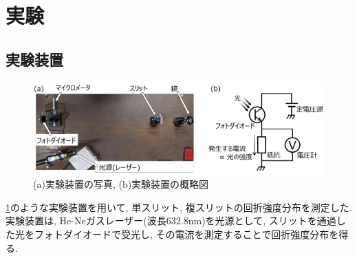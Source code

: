 \documentclass[11pt]{ltjsarticle}
\begin{document}
  \section*{実験}
    \subsection*{実験装置}
      \begin{figure}[H]
        \centering
        \includegraphics[width=0.96\columnwidth]{LD_kigu.png}
        \caption{(a)実験装置の写真, (b)実験装置の概略図}
        \label{fig:kigu}
      \end{figure}
      \noindent \cref{fig:kigu}のような実験装置を用いて, 単スリット, 複スリットの回折強度分布を測定した. \\
      実験装置は, He-Neガスレーザー(波長632.8nm)を光源として, スリットを通過した光をフォトダイオードで受光し, その電流を測定することで回折強度分布を得る.
\end{document}
